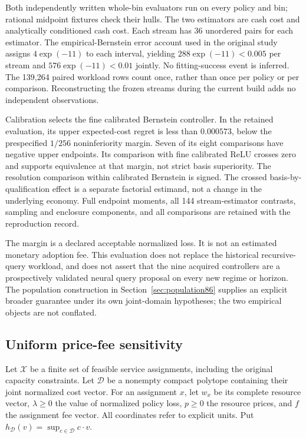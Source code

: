 Both independently written whole-bin evaluators run on every policy and bin; rational midpoint fixtures check their hulls. The two estimators are cash cost and analytically conditioned cash cost. Each stream has 36 unordered pairs for each estimator. The empirical-Bernstein error account used in the original study assigns $4\exp(-11)$ to each interval, yielding $288\exp(-11)<0.005$ per stream and $576\exp(-11)<0.01$ jointly. No fitting-success event is inferred. The 139,264 paired workload rows count once, rather than once per policy or per comparison. Reconstructing the frozen streams during the current build adds no independent observations.



Calibration selects the fine calibrated Bernstein controller. In the retained evaluation, its upper expected-cost regret is less than $0.000573$, below the prespecified $1/256$ noninferiority margin. Seven of its eight comparisons have negative upper endpoints. Its comparison with fine calibrated ReLU crosses zero and supports equivalence at that margin, not strict basis superiority. The resolution comparison within calibrated Bernstein is signed. The crossed basis-by-qualification effect is a separate factorial estimand, not a change in the underlying economy. Full endpoint moments, all 144 stream-estimator contrasts, sampling and enclosure components, and all comparisons are retained with the reproduction record.

The margin is a declared acceptable normalized loss. It is not an estimated monetary adoption fee. This evaluation does not replace the historical recursive-query workload, and does not assert that the nine acquired controllers are a prospectively validated neural query proposal on every new regime or horizon. The population construction in Section~\ref{sec:population86} supplies an explicit broader guarantee under its own joint-domain hypotheses; the two empirical objects are not conflated.

\subsection{Uniform price-fee sensitivity}\label{sec:prices86}
Let $\mathcal X$ be a finite set of feasible service assignments, including the original capacity constraints. Let $\mathcal D$ be a nonempty compact polytope containing their joint normalized cost vector. For an assignment $x$, let $w_x$ be its complete resource vector, $\lambda\ge0$ the value of normalized policy loss, $p\ge0$ the resource prices, and $f$ the assignment fee vector. All coordinates refer to explicit units. Put $h_{\mathcal D}(v)=\sup_{c\in\mathcal D}c\cdot v$.


